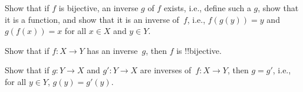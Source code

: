 \documentclass[../../../include/open-logic-section]{subfiles}
\begin{document}
\begin{prob}
Show that if $f$ is bijective, an inverse $g$ of $f$ exists, i.e.,
define such a $g$, show that it is a function, and show that it is an
inverse of~$f$, i.e., $f(g(y)) = y$ and $g(f(x)) = x$ for all $x \in
X$ and $y \in Y$.
\end{prob}

\begin{prob}
Show that if $f\colon X \to Y$ has an inverse~$g$, then $f$ is
!!{bijective}.
\end{prob}

\begin{prob}
Show that if $g\colon Y \to X$ and $g'\colon Y \to X$ are inverses
of~$f\colon X \to Y$, then $g = g'$, i.e., for all $y \in Y$, $g(y) =
g'(y)$.
\end{prob}
%
\end{document}
